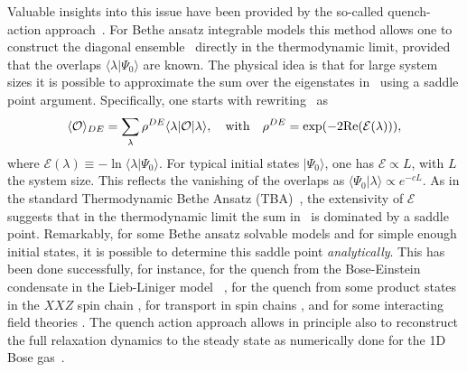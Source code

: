 \documentclass[11pt]{iopart}
\begin{document}
Valuable insights into this issue have been provided by the so-called quench-action 
approach~\cite{caux-2013}. For Bethe ansatz integrable models this method allows one 
to construct the diagonal ensemble~ directly in the thermodynamic 
limit, provided that the overlaps $\langle\lambda|\Psi_0\rangle$ are known. The 
physical idea is that for large system sizes it is possible to approximate the sum 
over the eigenstates in~ using a saddle point argument. Specifically, 
one starts with rewriting~ as 
%
\begin{equation}
\label{de1}
\langle{\mathcal O}\rangle_{DE}= \sum\limits_{\lambda}\rho^{DE}\langle\lambda|
{\mathcal O}|\lambda\rangle,\quad\textrm{with}\quad\rho^{DE}=\exp(-2{\rm Re}({\mathcal 
E}(\lambda))), 
\end{equation}
%
where ${\mathcal E}(\lambda)\equiv-\ln\langle\lambda|\Psi_0\rangle$. 
For typical initial states $|\Psi_0\rangle$,
one has ${\mathcal E}\propto L$, with $L$ the system size. This reflects the 
vanishing of the overlaps as $\langle\Psi_0|\lambda\rangle\propto e^{-c L}$.  
As in the standard Thermodynamic Bethe Ansatz (TBA)~\cite{taka-book}, the 
extensivity of ${\mathcal E}$ suggests that in the thermodynamic limit the 
sum in~ is dominated by a saddle point. Remarkably, for some Bethe 
ansatz solvable models and for simple enough initial states, it is possible to 
determine this saddle point {\it analytically}. This has been done successfully, 
for instance, for the quench from the Bose-Einstein condensate
 in the Lieb-Liniger model ~\cite{de-nardis-2014,ga-15,pce-2015,b-15}, 
 for the quench from some product states in the $XXZ$ spin chain \cite{pozsgay-2014A,wouters-2014A}, 
for transport in spin chains \cite{de_luca}, and for some interacting field theories \cite{bse-14}.  
The quench action approach allows in principle also to reconstruct the full relaxation dynamics 
to the steady state \cite{caux-2013} as numerically done for the 1D Bose 
gas~\cite{de-nardis-2015a,de-nardis-2015}. 
\end{document}
